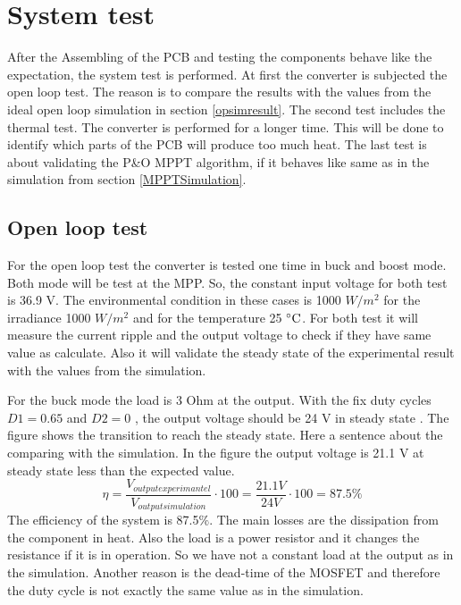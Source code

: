 \section{System test}
After the Assembling of the PCB and testing the components behave like the expectation, the system test is performed. At first the converter is subjected the open loop test. The reason is to compare the results with the values from the ideal open loop simulation in section \ref{opsimresult}. The second test includes the thermal test. The converter is performed for a longer time. This will be done to identify which parts of the PCB will produce too much heat. The last test is about validating the P\&O MPPT algorithm, if it behaves like same as in the simulation from section \ref{MPPTSimulation}.

\subsection{Open loop test}
For the open loop test the converter is tested one time in buck and boost mode. Both mode will be test at the MPP. So, the constant input voltage for both test is 36.9 V. The environmental condition in these cases is 1000 $W /m^2$ for the irradiance 1000 $W /m^2$ and for the temperature 25 $\decC$. For both test it will measure the current ripple and the output voltage to check if they have same value as calculate. Also it will validate the steady state of the experimental result with the values from the simulation.

For the buck mode the load is 3 Ohm at the output. With the fix duty cycles $D1 = 0.65$ and  $D2 = 0$ , the output voltage should be 24 V in steady state . The figure shows the transition to reach the steady state. Here a sentence about the comparing with the simulation.  In the figure the output voltage is 21.1 V  at steady state less than the expected value.
\begin{equation}\label{effiencybuckmode}
\eta = \frac{V_{outputexperimantel}}{V_{output simulation}} \cdot 100 = \frac{21.1V}{24V} \cdot 100 = 87.5 \%
\end{equation}
The efficiency of the system is 87.5$\%$. The main losses are the dissipation from the component in heat. Also the load is a power resistor and it changes the resistance if it is in operation. So we have not a constant load at the output as in the simulation. Another reason is the dead-time of the MOSFET and therefore the duty cycle is not exactly the same value as in the simulation. 

